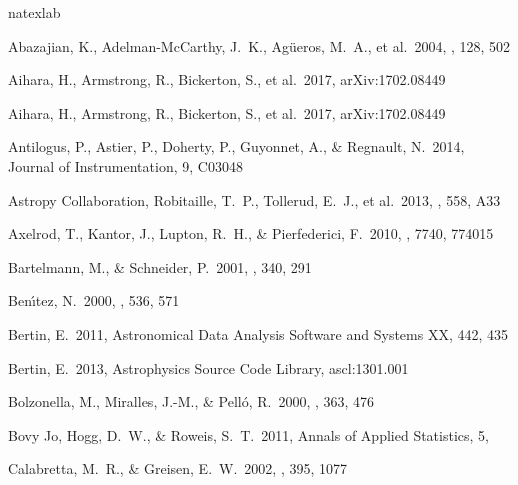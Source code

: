 \documentclass[useamsfonts]{pasj01}
\begin{document}
\begin{thebibliography}{}
    \label{sec:ref}
    \expandafter\ifx\csname natexlab\endcsname\relax\def\natexlab#1{#1}\fi

     Abazajian, K., Adelman-McCarthy,
             J.~K., Ag{\"u}eros, M.~A., et al.\ 2004, \aj, 128, 502

     Aihara, H., Armstrong, R., Bickerton, S.,
             et al.\ 2017, arXiv:1702.08449
             
     Aihara, H., Armstrong, R., 
             Bickerton, S., et al.\ 2017, arXiv:1702.08449 

     Antilogus, P., Astier, P.,
             Doherty, P., Guyonnet, A., \& Regnault, N.\ 2014, Journal of
             Instrumentation, 9, C03048

     Astropy Collaboration,
             Robitaille, T.~P., Tollerud, E.~J., et al.\ 2013, \aap, 558, A33

     Axelrod, T., Kantor, J., Lupton,
             R.~H., \& Pierfederici, F.\ 2010, \procspie, 7740, 774015

     Bartelmann, M., \&
             Schneider, P.\ 2001, \physrep, 340, 291

     Ben{\'{\i}}tez, N.\ 2000, \apj,
             536, 571

     Bertin, E.\ 2011, Astronomical Data Analysis
             Software and Systems XX, 442, 435

     Bertin, E.\ 2013, Astrophysics Source
             Code Library, ascl:1301.001

     Bolzonella, M., Miralles, J.-M.,
            \& Pell{\'o}, R.\ 2000, \aap, 363, 476

     Bovy Jo, Hogg, D.~W., \& Roweis,
             S.~T.\ 2011, Annals of Applied Statistics, 5,

     Calabretta, M.~R., \& Greisen, E.~W.\
             2002, \aap, 395, 1077
             

\end{thebibliography}
\end{document}
